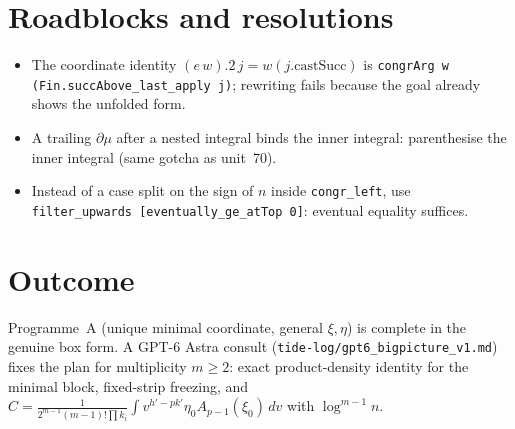 \documentclass[11pt]{article}
\begin{document}
\section{Roadblocks and resolutions}
\begin{itemize}
\item The coordinate identity $(e\,w).2\,j = w(j.\mathrm{castSucc})$ is
\texttt{congrArg w (Fin.succAbove\_last\_apply j)}; rewriting fails because the goal already shows
the unfolded form.
\item A trailing $\partial\mu$ after a nested integral binds the inner integral: parenthesise the
inner integral (same gotcha as unit~70).
\item Instead of a case split on the sign of $n$ inside \texttt{congr\_left}, use
\texttt{filter\_upwards [eventually\_ge\_atTop 0]}: eventual equality suffices.
\end{itemize}

\section{Outcome}
Programme~A (unique minimal coordinate, general $\xi,\eta$) is complete in the genuine box form.
A GPT-6 Astra consult (\texttt{tide-log/gpt6\_bigpicture\_v1.md}) fixes the plan for multiplicity
$m\ge2$: exact product-density identity for the minimal block, fixed-strip freezing, and
$C=\frac{1}{2^{m-1}(m-1)!\prod k_i}\int v^{h'-pk'}\eta_0A_{p-1}(\xi_0)\,dv$ with $\log^{m-1}n$.
\end{document}
